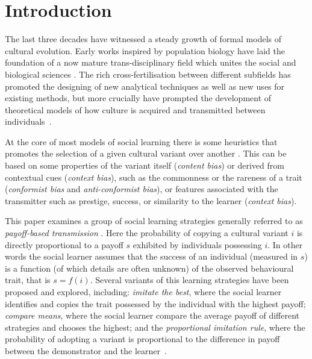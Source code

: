 \documentclass[review,authoryear]{elsarticle}
\begin{document}
\section{Introduction}

The last three decades have witnessed a steady growth of formal models of cultural evolution. Early works inspired by population biology \citep{cavallisforza_feldman_1981,boyd1985} have laid the foundation of a now mature trans-disciplinary field which unites the social and biological sciences \citep{mesoudi_etal_2006, mcelreath_and_boyd_2007}. The rich cross-fertilisation between different subfields has promoted the designing of new analytical techniques as well as new uses for existing methods, but more crucially have prompted the development of theoretical models of how culture is acquired and transmitted between individuals~\citep{henrich_mcelreath2003,laland2004,mcelreath_and_boyd_2007,shennan_2009_patternprocess,Kempe_and_Mesoudi_2014,mesoudi_cultural_2015}. 

At the core of most models of social learning there is some heuristics that promotes the selection of a given cultural variant over another \citep{laland2004}. This can be based on some properties of the variant itself (\emph{content bias}) or derived from contextual cues (\emph{context bias}), such as the commonness or the rareness of a trait (\emph{conformist bias} and \emph{anti-conformist bias}), or  features associated with the transmitter such as prestige, success, or similarity to the learner (\emph{context bias})\citep{henrich_mcelreath2003}. 

This paper examines a group of social learning strategies generally referred to as \emph{payoff-based transmission} \citep{schlag1998,kendal_etal_2009,lake_and_crema_2012,baldini2013,kandler_and_laland_2013,crema_lake_inpress}. Here the probability of copying a cultural variant $i$ is directly proportional to a payoff $s$ exhibited by individuals possessing $i$. In other words the social learner assumes that the success of an individual (measured in $s$) is a function (of which details are often unknown) of the observed behavioural trait, that is $s=f(i)$. Several variants of this learning strategies have been proposed and explored, including: \emph{imitate the best}, where the social learner identifies and copies the trait possessed by the individual with the highest payoff; \emph{compare means}, where the social learner compare the average payoff of different strategies and chooses the highest; and the \emph{proportional imitation rule}, where the probability of adopting a variant is proportional to the difference in payoff between the demonstrator and the learner~\citep{schlag1998,baldini2013,crema_lake_inpress}. 
\end{document}
